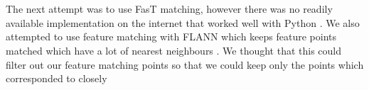 \documentclass[12pt,twoside]{report}
\begin{document}
\\\\
The next attempt was to use FasT matching, however there was no readily available implementation on the internet that worked well with Python \cite{fastmatching}. We also attempted to use feature matching with FLANN which keeps feature points matched which have a lot of nearest neighbours \cite{flann}. We thought that this could filter out our feature matching points so that we could keep only the points which corresponded to closely
\begin{figure}[!h]
\begin{center}
      \\\\

\end{center}
\end{figure}
\end{document}
